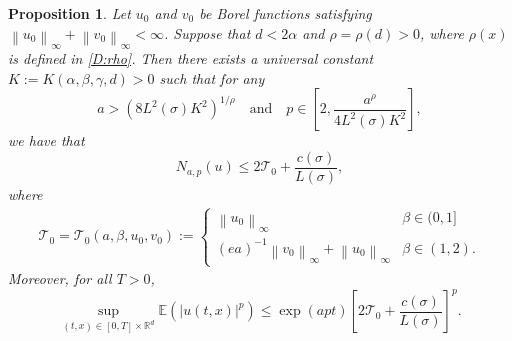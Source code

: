 \documentclass[a4paper,11pt]{article}
\numberwithin{equation}{section}
\theoremstyle{plain}
\newtheorem{proposition}[theorem]{Proposition}
\theoremstyle{definition}
\newcommand{\Norm}[1]{\left\|  #1   \right\|}
\newcommand{\R}{\mathbb{R}}
\numberwithin{NQ}{section}
\numberwithin{LQ}{section}
\numberwithin{ZQ}{section}
\begin{document}
\begin{proposition}{\normalfont\cite[Proposition 3.2]{millet.sanz-sole:21:global}} \label{P:N(u)Bdd}
  Let $u_0$ and $v_0$ be Borel functions satisfying $\Norm{u_0}_\infty + \Norm{v_0}_\infty <
  \infty$. Suppose that $d < 2 \alpha$ and $\rho = \rho(d) > 0$, where $\rho(x)$ is defined in
  \eqref{D:rho}. Then there exists a universal constant $K:=K(\alpha, \beta, \gamma,d) >0$ such that
  for any
  \[
  a > \left( 8 L^2(\sigma)K^2\right)^{1/\rho}
  \quad \text{and} \quad
  p \in \left[ 2, \frac{a^{\rho}}{4L^2(\sigma)K^2} \right],
  \]
  we have that
  \begin{equation} \label{E:Nbdd}
  N_{a,p}(u)  \le 2 \mathcal{T}_0 +  \frac{c(\sigma)}{L(\sigma)},
  \end{equation}
  where
  \begin{align*}
    \mathcal{T}_0 = \mathcal{T}_0(a, \beta, u_0, v_0)  := \begin{cases}
   \Norm{u_0}_\infty                               & \beta \in (0,1] \\
   (ea)^{-1} \Norm{v_0}_\infty + \Norm{u_0}_\infty & \beta \in (1,2).
    \end{cases}
  \end{align*}
  Moreover, for all $T>0$,
  \begin{equation} \label{E:Pnormtbdd}
  \sup_{(t,x) \in [0,T] \times \R^d} \mathbb{E}(|u(t,x)|^p) \le \exp\left( a p t  \right) \left[ 2 \mathcal{T}_0 + \frac{ c(\sigma) }{L(\sigma)} \right]^p.
  \end{equation}
\end{proposition}
\end{document}
